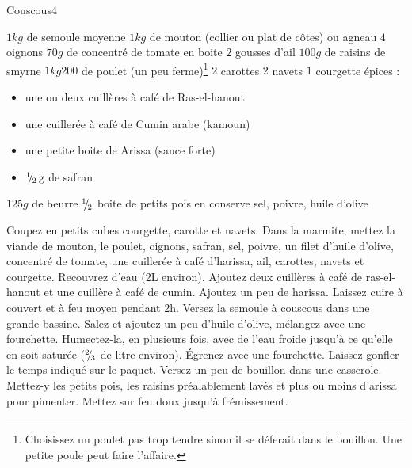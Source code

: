 \begin{recette}{Couscous}{4}{}{}
\begin{ingredients}[8 pers.]
\ingredient $1\unit{kg}$ de semoule moyenne
\ingredient $1\unit{kg}$ de mouton (collier ou plat de côtes) ou agneau
\ingredient $4$ oignons
\ingredient $70\unit{g}$ de concentré de tomate en boite
\ingredient $2$ gousses d'ail
\ingredient $100\unit{g}$ de raisins de smyrne
\ingredient $1\unit{kg} 200$ de poulet (un peu ferme)\footnote{Choisissez un poulet pas trop tendre sinon il se déferait dans le 
bouillon. Une petite poule peut faire l'affaire.}
\ingredient $2$ carottes
\ingredient $2$ navets
\ingredient $1$ courgette
\ingredient épices : \begin{itemize}
		\item une ou deux cuillères à café de Ras-el-hanout
		\item une cuillerée à café de Cumin arabe (kamoun)
		\item une petite boite de Arissa (sauce forte)
		\item ${{}^{1\!\!}/ _{\!2}}\mathrm{\thinspace g}$ de safran
		\end{itemize}
\ingredient $125\unit{g}$ de beurre
\ingredient ${{}^{1\!\!}/ _{\!2}}$ boite de petits pois en conserve
\ingredient sel, poivre, huile d'olive
\end{ingredients}

\begin{preparation}
\etape Coupez en petits cubes courgette, carotte et navets.
\etape Dans la marmite, mettez la viande de mouton, le poulet, oignons, safran, sel, 
poivre, un filet d'huile d'olive, concentré de tomate, une cuillerée à café d'harissa, ail, carottes, navets et courgette. 
Recouvrez d'eau (2L environ). Ajoutez deux cuillères à café de ras-el-hanout et une cuillère à café de cumin. Ajoutez un peu de 
harissa. Laissez cuire à couvert et à feu moyen pendant 2h.
\etape Versez la semoule à couscous dans une grande bassine. Salez et ajoutez un peu d'huile d'olive, mélangez avec une 
fourchette. Humectez-la, en plusieurs fois, avec de l'eau froide jusqu'à 
ce qu'elle en soit saturée (${{}^{2\!\!}/ _{\!3}}$ de litre environ). Égrenez avec une fourchette. 
Laissez gonfler le temps indiqué sur le paquet.
\etape Versez un peu de bouillon dans une casserole. Mettez-y les petits pois, les raisins préalablement lavés et plus ou moins 
d'arissa pour pimenter. Mettez sur feu doux jusqu'à frémissement.
\end{preparation}

\end{recette}

